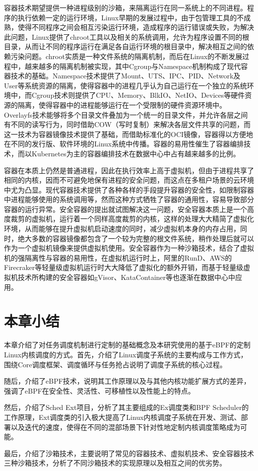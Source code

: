 容器技术期望提供一种进程级别的沙箱，来隔离运行在同一系统上的不同进程。程序的执行依赖一定的运行环境，Linux早期的发展过程中，由于包管理工具的不成熟，使得不同程序之间会相互污染运行环境，造成程序的运行错误或失败，为解决此问题，Linux提供了chroot工具以及相关的系统调用，允许为程序设置不同的根目录，从而让不同的程序运行在满足各自运行环境的根目录中，解决相互之间的依赖污染问题。chroot实质是一种文件系统的隔离机制，而后在Linux的不断发展过程中，越来越多的隔离机制被实现，其中Cgroup与Namespace机制构成了现代容器技术的基础。Namespace技术提供了Mount、UTS、IPC、PID、Network及User等系统资源的隔离，使得容器中的进程几乎认为自己运行在一个独立的系统环境中，而Cgroup技术则提供了CPU、Memory、BlkIO、NetIO、Devices等硬件资源的隔离，使得容器中的进程能够运行在一个受限制的硬件资源环境中。Overlayfs技术能够将多个目录文件叠加为一个统一的目录文件，并允许各层之间有不同的读写行为，同时借助COW（写时复制）来解决各层文件共享的问题，而这一技术为容器镜像技术提供了基础，而借助标准化的OCI镜像，容器得以方便地在不同的发行版、软件环境的Linux系统中传播。容器的易用性催生了容器编排技术，而以Kubernetes为主的容器编排技术在数据中心中占有越来越多的比例。

容器在本质上仍然是普通进程，因此在执行效率上高于虚拟机，但由于进程共享了相同的内核，因而不可避免地保有进程的安全问题，而这点在多租户场景的云环境中尤为凸显。现代容器技术提供了各种各样的手段提升容器的安全性，如限制容器中进程能够使用的系统调用等，然而这种方式牺牲了容器的通用性，容易导致部分容器的运行异常。安全容器的提出就试图解决这一问题，安全容器本质上是一个高度裁剪的虚拟机，运行着一个同样高度裁剪的内核，这样的处理大大精简了虚拟化环境，从而能够在提升虚拟机启动速度的同时，减少虚拟机本身的内存占用，同时，绝大多数的容器镜像都包含了一个较为完整的根文件系统，稍作处理后就可以作为一个虚拟机镜像来提供虚拟机使用。安全容器作为一种沙箱技术，结合了虚拟机的强隔离性与容器的易用性，在虚拟机运行时上，阿里的RunD\citep{li2022rund}、AWS的Firecraker\citep{agache2020firecracker}等轻量级虚拟机运行时大大降低了虚拟化的额外开销，而基于轻量级虚拟机技术所构建的安全容器如gVisor、KataContainer\citep{randazzo2019kata}等也逐渐在数据中心中应用。

\section{本章小结}

本章介绍了对任务调度机制进行定制的基础概念及本研究使用的基于eBPF的定制Linux内核调度的方式。首先，介绍了Linux调度子系统的主要构成与工作方式，围绕Core调度框架、调度循环与任务抢占说明了调度子系统的核心过程。

随后，介绍了eBPF技术，说明其工作原理以及与其他内核功能扩展方式的差异，强调了eBPF在安全性、灵活性、可移植性以及性能上的特点。

然后，介绍了Sched Ext项目，分析了其主要组成的Ex调度类和BPF Scheduler的工作原理，Ext调度类的引入极大提高了Linux内核调度子系统在开发、测试、部署以及迭代的速度，使得在不同的混部场景下针对性地定制内核调度策略成为可能。

最后，介绍了沙箱技术，主要说明了常见的容器技术、虚拟机技术、安全容器技术三种沙箱技术，分析了不同沙箱技术的实现原理以及相互之间的优劣势。